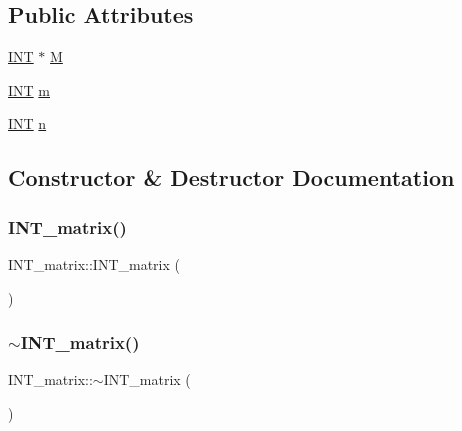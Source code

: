 \subsection*{Public Attributes}
\begin{DoxyCompactItemize}
\item 
\mbox{\hyperlink{galois_8h_a09fddde158a3a20bd2dcadb609de11dc}{I\+NT}} $\ast$ \mbox{\hyperlink{class_i_n_t__matrix_a1606a8dc98ede12b2aac3a706fe47528}{M}}
\item 
\mbox{\hyperlink{galois_8h_a09fddde158a3a20bd2dcadb609de11dc}{I\+NT}} \mbox{\hyperlink{class_i_n_t__matrix_a15b2c0e2ff35acea0ee975e3c1044c5f}{m}}
\item 
\mbox{\hyperlink{galois_8h_a09fddde158a3a20bd2dcadb609de11dc}{I\+NT}} \mbox{\hyperlink{class_i_n_t__matrix_a23dc7a503832dd0fa661d3e42f378742}{n}}
\end{DoxyCompactItemize}


\subsection{Constructor \& Destructor Documentation}
\mbox{\label{class_i_n_t__matrix_af9f33540ce53964e21c63f272612ec6f}} 
\subsubsection{\texorpdfstring{I\+N\+T\+\_\+matrix()}{INT\_matrix()}}
{\footnotesize\ttfamily I\+N\+T\+\_\+matrix\+::\+I\+N\+T\+\_\+matrix (\begin{DoxyParamCaption}{ }\end{DoxyParamCaption})}

\mbox{\label{class_i_n_t__matrix_a6896ec5fe1bbb5a13fd71d35bad8cdea}} 
\subsubsection{\texorpdfstring{$\sim$\+I\+N\+T\+\_\+matrix()}{~INT\_matrix()}}
{\footnotesize\ttfamily I\+N\+T\+\_\+matrix\+::$\sim$\+I\+N\+T\+\_\+matrix (\begin{DoxyParamCaption}{ }\end{DoxyParamCaption})}



